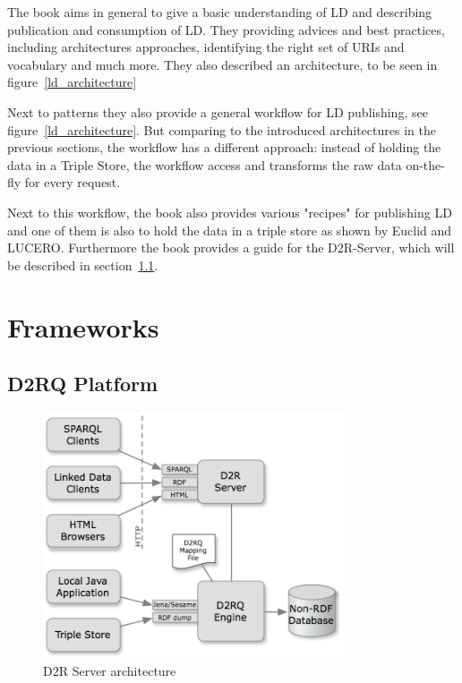 The book aims in general to give a basic understanding of LD and describing publication and consumption of LD. They providing advices and best practices, including architectures approaches, identifying the right set of URIs and vocabulary and much more. They also described an architecture, to be seen in figure~\ref{ld_architecture}

Next to patterns they also provide a general workflow for LD publishing, see figure~\ref{ld_architecture}. But comparing to the introduced architectures in the previous sections, the workflow has a different approach: instead of holding the data in a Triple Store, the workflow access and transforms the raw data on-the-fly for every request.

Next to this workflow, the book also provides various "recipes" for publishing LD and one of them is also to hold the data in a triple store as shown by Euclid and LUCERO. Furthermore the book provides a guide for the D2R-Server, which will be described in section~\ref{d2rq}.

\newpage
\section{Frameworks}

\subsection{D2RQ Platform}\label{d2rq}

\begin{figure}[htbp]
	\centering
\includegraphics[width=0.8\textwidth]{img/d2rq_architecture.png}
	\caption{D2R Server architecture}
	\label{d2rq_architecture}
\end{figure}

